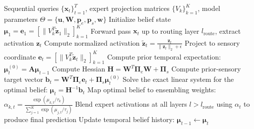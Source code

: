\documentclass{article}
\theoremstyle{plain}
\theoremstyle{definition}
\theoremstyle{remark}
\begin{document}
\begin{algorithm}[H]
\caption{Active Inference Routing (AIR) Serving Loop}
\label{alg:air_serving}
\begin{algorithmic}[1]
\REQUIRE Sequential queries $\{\mathbf{x}_t\}_{t=1}^T$, expert projection matrices $\{V_k\}_{k=1}^K$, model parameters $\Theta = \{\mathbf{u}, \mathbf{W}, \mathbf{p}_e, \mathbf{p}_s, \mathbf{w}\}$
\STATE Initialize belief state $\mathbf{\mu}_1 = \mathbf{e}_1 = [\|V_k^T \tilde{\mathbf{z}}_1\|_2]_{k=1}^K$
    \STATE Forward pass $\mathbf{x}_t$ up to routing layer $l_{\text{route}}$, extract activation $\mathbf{z}_t$
    \STATE Compute normalized activation $\tilde{\mathbf{z}}_t = \frac{\mathbf{z}_t}{\| \mathbf{z}_t \|_2 + \epsilon}$
    \STATE Project to sensory coordinate $\mathbf{e}_t = [\|V_k^T \tilde{\mathbf{z}}_t\|_2]_{k=1}^K$
    \STATE Compute prior temporal expectation: $\mathbf{\mu}_t^{(0)} = \mathbf{A}\mathbf{\mu}_{t-1}$
    \STATE Compute Hessian $\mathbf{H} = \mathbf{W}^T \mathbf{\Pi}_e \mathbf{W} + \mathbf{\Pi}_s$
    \STATE Compute prior-sensory target vector $\mathbf{b}_t = \mathbf{W}^T \mathbf{\Pi}_e \mathbf{e}_t + \mathbf{\Pi}_s \mathbf{\mu}_t^{(0)}$
    \STATE Solve the exact linear system for the optimal belief: $\mathbf{\mu}_t = \mathbf{H}^{-1} \mathbf{b}_t$
    \STATE Map optimal belief to ensembling weights: \\
    $\alpha_{k, t} = \frac{\exp(\mu_{k, t}/\tau_k)}{\sum_{j=1}^K \exp(\mu_{j, t}/\tau_j)}$
    \STATE Blend expert activations at all layers $l > l_{\text{route}}$ using $\alpha_t$ to produce final prediction
    \STATE Update temporal belief history: $\mathbf{\mu}_{t-1} \leftarrow \mathbf{\mu}_t$
\ENDFOR
\end{algorithmic}
\end{algorithm}
\end{document}
